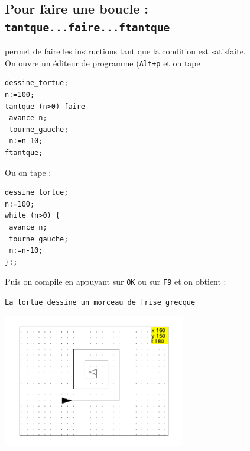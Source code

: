 \documentclass[a4paper,11pt]{book}
\begin{document}
\subsection{Pour faire une boucle : {\tt tantque...faire...ftantque}}
 permet de 
faire les instructions tant que la condition est satisfaite.\\
On ouvre un \'editeur de programme ({\tt Alt+p} et on tape :
\begin{verbatim}
dessine_tortue;
n:=100;
tantque (n>0) faire 
 avance n;
 tourne_gauche;
 n:=n-10;
ftantque;
\end{verbatim}
Ou on tape :\\
\begin{verbatim}
dessine_tortue;
n:=100;
while (n>0) {
 avance n;
 tourne_gauche;
 n:=n-10;
}:;
\end{verbatim}
Puis on compile en appuyant sur {\tt OK} ou sur {\tt F9} et on obtient :
\begin{center}{\tt La tortue dessine un morceau de frise grecque}\end{center}
\begin{center}\includegraphics[width=8cm]{tortue0}\end{center}
\end{document}
